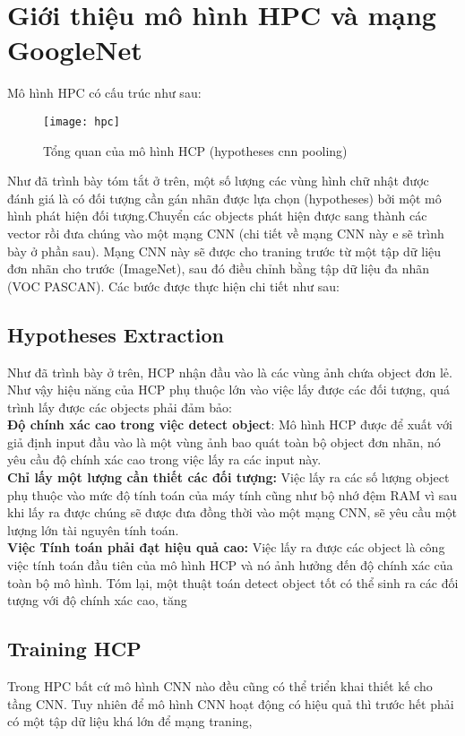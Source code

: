 \documentclass[13pt, a4paper]{extreport}
\begin{document}
\section{Giới thiệu mô hình HPC và mạng GoogleNet}
\indent Mô hình HPC có cấu trúc như sau:
\begin{figure}[H]
  \centering
    \texttt{[image: hpc]}
   \caption{\large Tổng quan của mô hình HCP (hypotheses cnn pooling)}
\end{figure}
\indent Như đã trình bày tóm tắt ở trên, một số lượng các vùng hình chữ nhật được đánh giá là có đối tượng cần gán nhãn được lựa chọn (hypotheses) bởi một mô hình phát hiện đối tượng.Chuyển các objects phát hiện được sang thành các vector rồi đưa chúng vào một mạng CNN (chi tiết về mạng CNN này e sẽ trình bày ở phần sau). Mạng CNN này sẽ được cho traning trước từ một tập dữ liệu đơn nhãn cho trước (ImageNet), sau đó điều chỉnh bằng tập dữ liệu đa nhãn (VOC PASCAN). Các bước được thực hiện chi tiết như sau:
\subsection{Hypotheses Extraction}
Như đã trình bày ở trên, HCP nhận đầu vào là các vùng ảnh chứa object đơn lẻ. Như vậy hiệu năng của HCP phụ thuộc lớn vào việc lấy được các đối tượng, quá trình lấy được các objects phải đảm bảo:\\
\indent \textbf{Độ chính xác cao trong việc detect object}: Mô hình HCP được để xuất với giả định input đầu vào là một vùng ảnh bao quát toàn bộ object đơn nhãn, nó yêu cầu độ chính xác cao trong việc lấy ra các input này.\\
\indent \textbf{Chỉ lấy một lượng cần thiết các đối tượng:} Việc lấy ra các số lượng object phụ thuộc vào mức độ tính toán của máy tính cũng như bộ nhớ đệm RAM vì sau khi lấy ra được chúng sẽ được đưa đồng thời vào một mạng CNN, sẽ yêu cầu một lượng lớn tài nguyên tính toán.\\
\indent \textbf{Việc Tính toán phải đạt hiệu quả cao:} Việc lấy ra được các object là công việc tính toán đầu tiên của mô hình HCP và nó ảnh hưởng đến độ chính xác của toàn bộ mô hình. Tóm lại, một thuật toán detect object tốt có thể sinh ra các đối tượng với độ chính xác cao, tăng
\subsection{Training HCP}
Trong HPC bất cứ mô hình CNN nào đều cũng có thể triển khai thiết kế cho tầng CNN. Tuy nhiên để mô hình CNN hoạt động có hiệu quả thì trước hết phải có một tập dữ liệu khá lớn để mạng traning,
\end{document}
